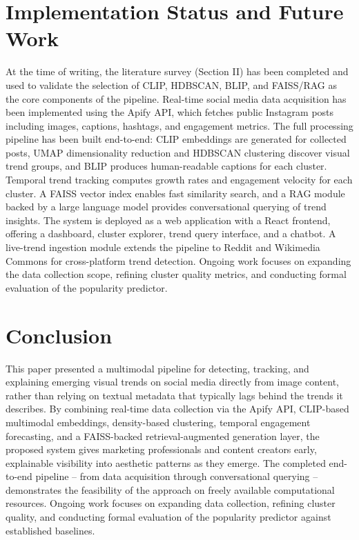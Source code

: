 \documentclass[conference]{IEEEtran}
\begin{document}
\section{Implementation Status and Future Work}

At the time of writing, the literature survey (Section II) has been completed and used to validate the selection of CLIP, HDBSCAN, BLIP, and FAISS/RAG as the core components of the pipeline. Real-time social media data acquisition has been implemented using the Apify API, which fetches public Instagram posts including images, captions, hashtags, and engagement metrics. The full processing pipeline has been built end-to-end: CLIP embeddings are generated for collected posts, UMAP dimensionality reduction and HDBSCAN clustering discover visual trend groups, and BLIP produces human-readable captions for each cluster. Temporal trend tracking computes growth rates and engagement velocity for each cluster. A FAISS vector index enables fast similarity search, and a RAG module backed by a large language model provides conversational querying of trend insights. The system is deployed as a web application with a React frontend, offering a dashboard, cluster explorer, trend query interface, and a chatbot. A live-trend ingestion module extends the pipeline to Reddit and Wikimedia Commons for cross-platform trend detection. Ongoing work focuses on expanding the data collection scope, refining cluster quality metrics, and conducting formal evaluation of the popularity predictor.

\section{Conclusion}

This paper presented a multimodal pipeline for detecting, tracking, and explaining emerging visual trends on social media directly from image content, rather than relying on textual metadata that typically lags behind the trends it describes. By combining real-time data collection via the Apify API, CLIP-based multimodal embeddings, density-based clustering, temporal engagement forecasting, and a FAISS-backed retrieval-augmented generation layer, the proposed system gives marketing professionals and content creators early, explainable visibility into aesthetic patterns as they emerge. The completed end-to-end pipeline -- from data acquisition through conversational querying -- demonstrates the feasibility of the approach on freely available computational resources. Ongoing work focuses on expanding data collection, refining cluster quality, and conducting formal evaluation of the popularity predictor against established baselines.
\end{document}
